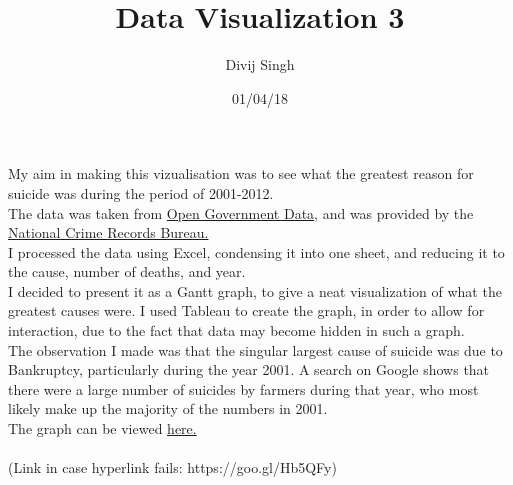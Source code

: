 \documentclass{article}
\title{Data Visualization 3}
\author{Divij Singh}
\date{01/04/18}
\begin{document}
	\maketitle
	
	My aim in making this vizualisation was to see what the greatest reason for suicide was during the period of 2001-2012.\\
	The data was taken from \href{https://data.gov.in}{Open Government Data}, and was provided by the \href{http://ncrb.gov.in/}{National Crime Records Bureau.}\\
	I processed the data using Excel, condensing it into one sheet, and reducing it to the cause, number of deaths, and year.\\
	I decided to present it as a Gantt graph, to give a neat visualization of what the greatest causes were. I used Tableau to create the graph, in order to allow for interaction, due to the fact that data may become hidden in such a graph.\\
	The observation I made was that the singular largest cause of suicide was due to Bankruptcy, particularly during the year 2001. A search on Google shows that there were a large number of suicides by farmers during that year, who most likely make up the majority of the numbers in 2001.\\
	The graph can be viewed \href{https://public.tableau.com/profile/divij.singh\#!/vizhome/SuicidesPerYearinIndiaSortedbyCauses/Sheet1}{here.}\\
	\\
	(Link in case hyperlink fails: https://goo.gl/Hb5QFy)
	
	
\end{document}
